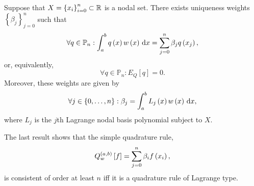\begin{frame}
    \begin{theorem}
        Suppose that $X={\left\{x_{i}\right\}}_{i=0}^{n}\subset\mathbb{R}$ is a nodal set.
        There exists uniqueness weights $\left\{\beta_{j}\right\}_{j=0}^{n}$
        such that
        \begin{equation*}
            \forall q\in\mathbb{P}_{n}:
            \int_{a}^{b}
            q\left(x\right)
            w\left(x\right)
            \dl x=
            \sum_{j=0}^{n}
            \beta_{j}
            q\left(x_{j}\right),
        \end{equation*}
        or, equivalently,
        \begin{equation*}
            \forall q\in\mathbb{P}_{n}:
            E_{Q}\left[q\right]=0.
        \end{equation*}
        Moreover, these weights are given by
        \begin{equation*}
            \forall j\in\left\{0,\dotsc,n\right\}:
            \beta_{j}=
            \int_{a}^{b}
            L_{j}\left(x\right)
            w\left(x\right)
            \dl x,
        \end{equation*}
        where $L_{j}$ is the $j$th Lagrange nodal basis polynomial subject to $X$.
    \end{theorem}

    \begin{theorem}[consistency]
        The last result shows that the simple quadrature rule,
        \begin{equation*}
            Q^{\left(a,b\right)}_{w}
            \left[f\right]=
            \sum_{j=0}^{n}
            \beta_{i}
            f\left(x_{i}\right),
        \end{equation*}
        is consistent of order at least $n$ iff it is a quadrature
        rule of Lagrange type.
    \end{theorem}
\end{frame}

